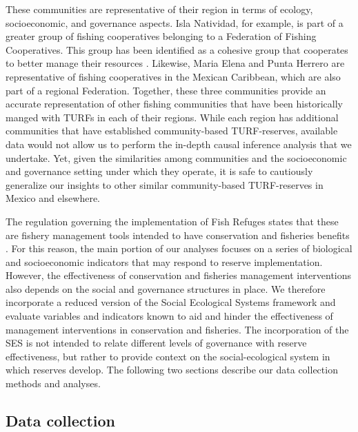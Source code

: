 \documentclass[10pt,letterpaper]{article}
\begin{document}
These communities are representative of their region in terms of ecology, socioeconomic, and governance aspects. Isla Natividad, for example, is part of a greater group of fishing cooperatives belonging to a Federation of Fishing Cooperatives. This group has been identified as a cohesive group that cooperates to better manage their resources \cite{mccay_2014,mccay_2017,acevesbueno_2017}. Likewise, Maria Elena and Punta Herrero are representative of fishing cooperatives in the Mexican Caribbean, which are also part of a regional Federation. Together, these three communities provide an accurate representation of other fishing communities that have been historically manged with TURFs in each of their regions. While each region has additional communities that have established community-based TURF-reserves, available data would not allow us to perform the in-depth causal inference analysis that we undertake. Yet, given the similarities among communities and the socioeconomic and governance setting under which they operate, it is safe to cautiously generalize our insights to other similar community-based TURF-reserves in Mexico and elsewhere.

The regulation governing the implementation of Fish Refuges states that these are fishery management tools intended to have conservation and fisheries benefits \cite{nom}. For this reason, the main portion of our analyses focuses on a series of biological and socioeconomic indicators that may respond to reserve implementation. However, the effectiveness of conservation and fisheries management interventions also depends on the social and governance structures in place. We therefore incorporate a reduced version of the Social Ecological Systems framework \cite{ostrom_2009} and evaluate variables and indicators known to aid and hinder the effectiveness of management interventions in conservation and fisheries. The incorporation of the SES is not intended to relate different levels of governance with reserve effectiveness, but rather to provide context on the social-ecological system in which reserves develop. The following two sections describe our data collection methods and analyses.

\subsection*{Data collection}
\end{document}
